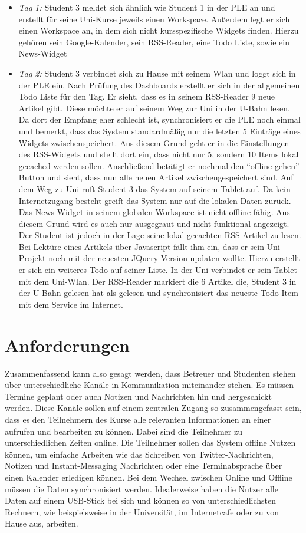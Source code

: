 \begin{itemize}
 \item \emph{Tag 1:} Student 3 meldet sich ähnlich wie Student 1 in der PLE an und erstellt für seine Uni-Kurse jeweils einen Workspace. Außerdem legt er sich einen Workspace an, in dem sich nicht kursspezifische Widgets finden. Hierzu gehören sein Google-Kalender, sein RSS-Reader, eine Todo Liste, sowie ein News-Widget
 \item \emph{Tag 2:} Student 3 verbindet sich zu Hause mit seinem Wlan und loggt sich in der PLE ein. Nach Prüfung des Dashboards erstellt er sich in der allgemeinen Todo Liste für den Tag. Er sieht, dass es in seinem RSS-Reader 9 neue Artikel gibt. Diese möchte er auf seinem Weg zur Uni in der U-Bahn lesen. Da dort der Empfang eher schlecht ist, synchronisiert er die PLE noch einmal und bemerkt, dass das System standardmäßig nur die letzten 5 Einträge eines Widgets zwischenspeichert. Aus diesem Grund geht er in die Einstellungen des RSS-Widgets und stellt dort ein, dass nicht nur 5, sondern 10 Items lokal gecached werden sollen. Anschließend betätigt er nochmal den “offline gehen” Button und sieht, dass nun alle neuen Artikel zwischengespeichert sind. Auf dem Weg zu Uni ruft Student 3 das System auf seinem Tablet auf. Da kein Internetzugang besteht greift das System nur auf die lokalen Daten zurück. Das News-Widget in seinem globalen Workspace ist nicht offline-fähig. Aus diesem Grund wird es auch nur ausgegraut und nicht-funktional angezeigt. Der Student ist jedoch in der Lage seine lokal gecachten RSS-Artikel zu lesen. Bei Lektüre eines Artikels über Javascript fällt ihm ein, dass er sein Uni-Projekt noch mit der neuesten JQuery Version updaten wollte. Hierzu erstellt er sich ein weiteres Todo auf seiner Liste.
 In der Uni verbindet er sein Tablet mit dem Uni-Wlan. Der RSS-Reader markiert die 6 Artikel die, Student 3 in der U-Bahn gelesen hat als gelesen und synchronisiert das neueste Todo-Item mit dem Service im Internet.  
\end{itemize}

\section{Anforderungen}\label{section:anforderungen_summary}
Zusammenfassend kann also gesagt werden, dass Betreuer und Studenten stehen über unterschiedliche Kanäle in Kommunikation miteinander stehen. Es müssen Termine geplant oder auch Notizen und Nachrichten hin und hergeschickt werden. Diese Kanäle sollen auf einem zentralen Zugang so zusammengefasst sein, dass es den Teilnehmern des Kurse alle relevanten Informationen an einer aufrufen und bearbeiten zu können. Dabei sind die Teilnehmer zu unterschiedlichen Zeiten online. Die Teilnehmer sollen das System offline Nutzen können, um einfache Arbeiten wie das Schreiben von Twitter-Nachrichten, Notizen und Instant-Messaging Nachrichten oder eine Terminabsprache über einen Kalender erledigen können. Bei dem Wechsel zwischen Online und Offline müssen die Daten synchronisiert werden. Idealerweise haben die Nutzer alle Daten auf einem USB-Stick bei sich und können so von unterschiedlichsten Rechnern, wie beispielsweise in der Universität, im Internetcafe oder zu von Hause aus, arbeiten.

